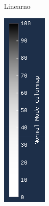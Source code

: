 \documentclass[times, utf8, diplomski]{fer}
\begin{document}
\begin{figure} [h]
\begin{subfigure}[h]{0.15\textwidth}
         \caption{Linearno}
         \label{fig:linear_legend}
     \end{subfigure}
     \hfill
     \begin{subfigure}[h]{0.15\textwidth}
         \centering
         \includegraphics[width=\textwidth]{cubic_colormap.png}

\end{subfigure}
\end{figure}
\end{document}
